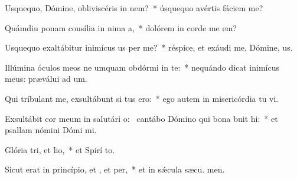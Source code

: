 \item Usquequo, Dómine, obliviscéris  in nem?~* úsquequo avértis fáciem   me?
\item Quámdiu ponam consília in nima a,~* dolórem in corde me  em?
\item Usquequo exaltábitur inimícus us per me?~* réspice, et exáudi me, Dómine,  us.
\item Illúmina óculos meos ne umquam obdórmi in te:~* nequándo dicat inimícus meus: præválui ad um.
\item Qui tríbulant me, exsultábunt si tus ero:~* ego autem in misericórdia tu vi.
\item Exsultábit cor meum in salutári o:~\pscross{} cantábo Dómino qui bona buit hi:~* et psallam nómini Dómi mi.
\item Glória tri, et lio,~* et Spirí to.
\item Sicut erat in princípio, et , et per,~* et in sǽcula sæcu. men.
